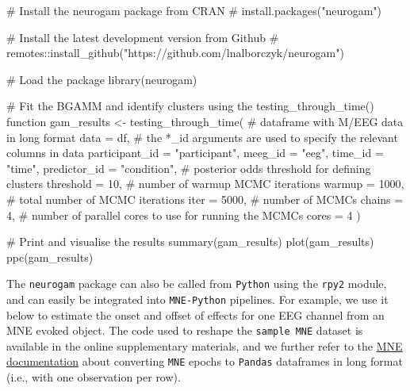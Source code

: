 \documentclass[
  doc,
  floatsintext,
  longtable,
  a4paper,
  nolmodern,
  notxfonts,
  notimes,
  colorlinks=true,linkcolor=blue,citecolor=blue,urlcolor=blue]{apa7}
\newenvironment{Shaded}{\begin{snugshade}}{\end{snugshade}}
\newcommand{\AttributeTok}[1]{\textcolor[rgb]{0.40,0.45,0.13}{#1}}
\newcommand{\CommentTok}[1]{\textcolor[rgb]{0.37,0.37,0.37}{#1}}
\newcommand{\DecValTok}[1]{\textcolor[rgb]{0.68,0.00,0.00}{#1}}
\newcommand{\FunctionTok}[1]{\textcolor[rgb]{0.28,0.35,0.67}{#1}}
\newcommand{\NormalTok}[1]{\textcolor[rgb]{0.00,0.23,0.31}{#1}}
\newcommand{\OtherTok}[1]{\textcolor[rgb]{0.00,0.23,0.31}{#1}}
\newcommand{\StringTok}[1]{\textcolor[rgb]{0.13,0.47,0.30}{#1}}
\begin{document}
\begin{Shaded}
\begin{Highlighting}[]
\CommentTok{\# Install the neurogam package from CRAN}
\CommentTok{\# install.packages("neurogam")}

\CommentTok{\# Install the latest development version from Github}
\CommentTok{\# remotes::install\_github("https://github.com/lnalborczyk/neurogam")}

\CommentTok{\# Load the package}
\FunctionTok{library}\NormalTok{(neurogam)}

\CommentTok{\# Fit the BGAMM and identify clusters using the testing\_through\_time() function}
\NormalTok{gam\_results }\OtherTok{\textless{}{-}} \FunctionTok{testing\_through\_time}\NormalTok{(}
    \CommentTok{\# dataframe with M/EEG data in long format}
    \AttributeTok{data =}\NormalTok{ df,}
    \CommentTok{\# the *\_id arguments are used to specify the relevant columns in data }
    \AttributeTok{participant\_id =} \StringTok{"participant"}\NormalTok{, }\AttributeTok{meeg\_id =} \StringTok{"eeg"}\NormalTok{,}
    \AttributeTok{time\_id =} \StringTok{"time"}\NormalTok{, }\AttributeTok{predictor\_id =} \StringTok{"condition"}\NormalTok{,}
    \CommentTok{\# posterior odds threshold for defining clusters}
    \AttributeTok{threshold =} \DecValTok{10}\NormalTok{,}
    \CommentTok{\# number of warmup MCMC iterations}
    \AttributeTok{warmup =} \DecValTok{1000}\NormalTok{,}
    \CommentTok{\# total number of MCMC iterations}
    \AttributeTok{iter =} \DecValTok{5000}\NormalTok{,}
    \CommentTok{\# number of MCMCs}
    \AttributeTok{chains =} \DecValTok{4}\NormalTok{,}
    \CommentTok{\# number of parallel cores to use for running the MCMCs}
    \AttributeTok{cores =} \DecValTok{4}
\NormalTok{    )}

\CommentTok{\# Print and visualise the results}
\FunctionTok{summary}\NormalTok{(gam\_results)}
\FunctionTok{plot}\NormalTok{(gam\_results)}
\FunctionTok{ppc}\NormalTok{(gam\_results)}
\end{Highlighting}
\end{Shaded}

\setlength{\parindent}{0pt}
\setlength{\parskip}{6pt}

The \texttt{neurogam} package can also be called from \texttt{Python}
using the \texttt{rpy2} module, and can easily be integrated into
\texttt{MNE-Python} pipelines. For example, we use it below to estimate
the onset and offset of effects for one EEG channel from an MNE evoked
object. The code used to reshape the \texttt{sample\ MNE} dataset is
available in the online supplementary materials, and we further refer to
the
\href{https://mne.tools/stable/auto_tutorials/epochs/50_epochs_to_data_frame.html}{MNE
documentation} about converting \texttt{MNE} epochs to \texttt{Pandas}
dataframes in long format (i.e., with one observation per row).
\end{document}
